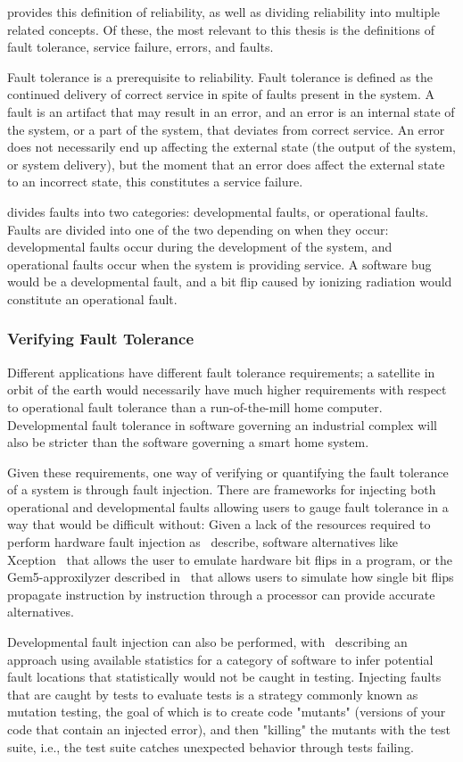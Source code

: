 \citet{avizienis2004basic} provides this definition of reliability, as well as dividing reliability into multiple related concepts. Of these, the most relevant to this thesis is the definitions of fault tolerance, service failure, errors, and faults.  

Fault tolerance is a prerequisite to reliability. Fault tolerance is defined as the continued delivery of correct service in spite of faults present in the system. A fault is an artifact that may result in an error, and an error is an internal state of the system, or a part of the system, that deviates from correct service. An error does not necessarily end up affecting the external state (the output of the system, or system delivery), but the moment that an error does affect the external state to an incorrect state, this constitutes a service failure.

\citet{avizienis2004basic} divides faults into two categories: developmental faults, or operational faults. Faults are divided into one of the two depending on when they occur: developmental faults occur during the development of the system, and operational faults occur when the system is providing service. A software bug would be a developmental fault, and a bit flip caused by ionizing radiation would constitute an operational fault.

\subsubsection{Verifying Fault Tolerance}

Different applications have different fault tolerance requirements; a satellite in orbit of the earth would necessarily have much higher requirements with respect to operational fault tolerance than a run-of-the-mill home computer. Developmental fault tolerance in software governing an industrial complex will also be stricter than the software governing a smart home system. 

Given these requirements, one way of verifying or quantifying the fault tolerance of a system is through fault injection. There are frameworks for injecting both operational and developmental faults allowing users to gauge fault tolerance in a way that would be difficult without: Given a lack of the resources required to perform hardware fault injection as~\citet{arlat1993fault} describe, software alternatives like Xception~\citep{carreira1998xception} that allows the user to emulate hardware bit flips in a program, or the Gem5-approxilyzer described in~\citet{venkatagiri2019gem5} that allows users to simulate how single bit flips propagate instruction by instruction through a processor can provide accurate alternatives.

Developmental fault injection can also be performed, with~\citet{natella2012fault} describing an approach using available statistics for a category of software to infer potential fault locations that statistically would not be caught in testing. Injecting faults that are caught by tests to evaluate tests is a strategy commonly known as mutation testing, the goal of which is to create code "mutants" (versions of your code that contain an injected error), and then "killing" the mutants with the test suite, i.e.,  the test suite catches unexpected behavior through tests failing.
